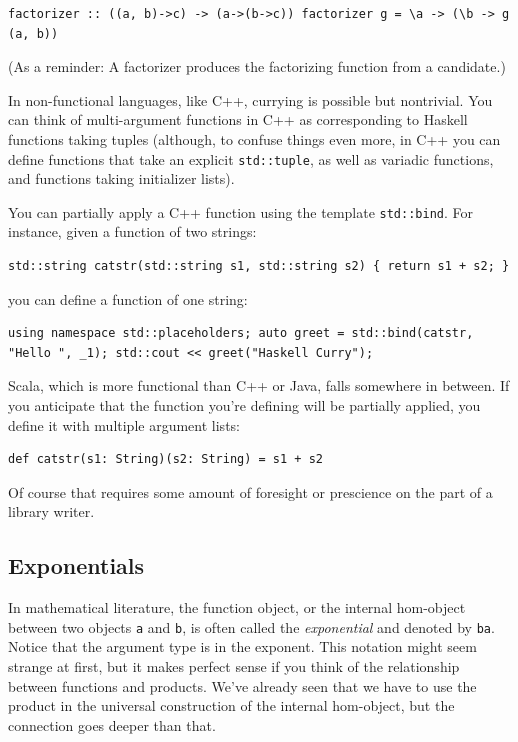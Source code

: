 \begin{verbatim}
factorizer :: ((a, b)->c) -> (a->(b->c)) factorizer g = \a -> (\b -> g (a, b))
\end{verbatim}

(As a reminder: A factorizer produces the factorizing function from a
candidate.)

In non-functional languages, like C++, currying is possible but
nontrivial. You can think of multi-argument functions in C++ as
corresponding to Haskell functions taking tuples (although, to confuse
things even more, in C++ you can define functions that take an explicit
\texttt{std::tuple}, as well as variadic functions, and functions taking
initializer lists).

You can partially apply a C++ function using the template
\texttt{std::bind}. For instance, given a function of two strings:

\begin{verbatim}
std::string catstr(std::string s1, std::string s2) { return s1 + s2; }
\end{verbatim}

you can define a function of one string:

\begin{verbatim}
using namespace std::placeholders; auto greet = std::bind(catstr, "Hello ", _1); std::cout << greet("Haskell Curry");
\end{verbatim}

Scala, which is more functional than C++ or Java, falls somewhere in
between. If you anticipate that the function you're defining will be
partially applied, you define it with multiple argument lists:

\begin{verbatim}
def catstr(s1: String)(s2: String) = s1 + s2
\end{verbatim}

Of course that requires some amount of foresight or prescience on the
part of a library writer.

\subsection{Exponentials}\label{exponentials}

In mathematical literature, the function object, or the internal
hom-object between two objects \texttt{a} and \texttt{b}, is often
called the \emph{exponential} and denoted by \texttt{ba}. Notice that
the argument type is in the exponent. This notation might seem strange
at first, but it makes perfect sense if you think of the relationship
between functions and products. We've already seen that we have to use
the product in the universal construction of the internal hom-object,
but the connection goes deeper than that.

